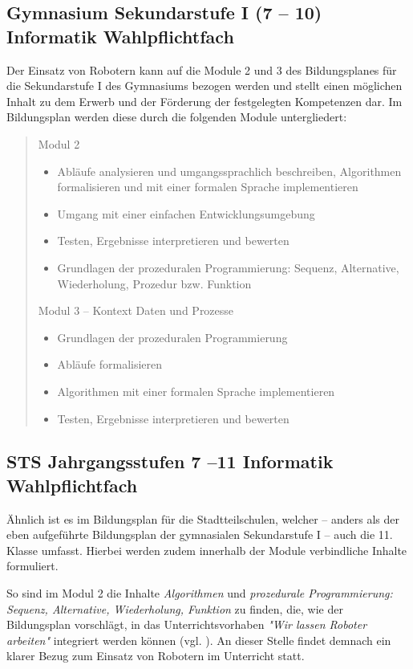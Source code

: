 \documentclass[paper=a4, DIV=calc, BCOR=12mm, twoside=on, onecolumn=on, open = right, titlepage =on, parskip =half-, headsepline = on, footsepline = off, chapterprefix = off, appendixprefix = on, fontsize = 12pt, numbers = noenddot, abstract = on]{scrbook}
\begin{document}
\subsection{Gymnasium Sekundarstufe I (7 -- 10) Informatik Wahlpflichtfach}
Der Einsatz von Robotern kann auf die Module 2 und 3 des Bildungsplanes für die Sekundarstufe I des Gymnasiums bezogen werden und stellt einen möglichen Inhalt zu dem Erwerb und der Förderung der festgelegten Kompetenzen dar. Im Bildungsplan werden diese durch die folgenden Module untergliedert:
\clearpage

 \begin{quote}
Modul 2
\begin{itemize}
\item Abläufe analysieren und umgangssprachlich beschreiben, Algorithmen formalisieren und mit einer formalen Sprache implementieren
\item Umgang mit einer einfachen Entwicklungsumgebung
\item Testen, Ergebnisse interpretieren und bewerten
\item Grundlagen der prozeduralen Programmierung: Sequenz, Alternative, Wiederholung, Prozedur bzw. Funktion
\end{itemize}

Modul 3 -- Kontext Daten und Prozesse
\begin{itemize}
\item Grundlagen der prozeduralen Programmierung
\item Abläufe formalisieren
\item Algorithmen mit einer formalen Sprache implementieren
\item Testen, Ergebnisse interpretieren und bewerten \hfill \cite{gymsek1:11} 
\end{itemize}
 \end{quote}


\subsection{STS Jahrgangsstufen 7 --11 Informatik Wahlpflichtfach}
Ähnlich ist es im Bildungsplan für die Stadtteilschulen, welcher -- anders als der eben aufgeführte Bildungsplan der gymnasialen Sekundarstufe I -- auch die 11. Klasse umfasst. Hierbei werden zudem innerhalb der Module verbindliche Inhalte formuliert.

So sind im Modul 2 die Inhalte \emph{Algorithmen} und \emph{prozedurale Programmierung: Sequenz, Alternative, Wiederholung, Funktion} zu finden, die, wie der Bildungsplan vorschlägt, in das Unterrichtsvorhaben \emph{"Wir lassen Roboter arbeiten"} integriert werden können (vgl. \cite{stsmittel:14}). An dieser Stelle findet demnach ein klarer Bezug zum Einsatz von Robotern im Unterricht statt.
\end{document}
